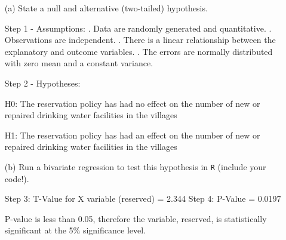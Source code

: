 \documentclass[12pt,letterpaper]{article}
\begin{document}
\newpage

\begin{enumerate}
	\item [(a)] State a null and alternative (two-tailed) hypothesis. 
	
	\noindent
	Step 1 - Assumptions:
	. Data are randomly generated and quantitative.
	. Observations are independent.
	. There is a linear relationship between the explanatory and outcome variables.
	. The errors are normally distributed with zero mean and a constant variance. 
	
	Step 2 - Hypotheses:
	
	H0: The reservation policy has had no effect on the number of new or repaired drinking water facilities in the villages
	
	H1: The reservation policy has had an effect on the number of new or repaired drinking water facilities in the villages
	
	\newpage
	
	\vspace{1cm}
	\item [(b)] Run a bivariate regression to test this hypothesis in \texttt{R} (include your code!).
	
	
	\noindent
	Step 3: T-Value for X variable (reserved)  = 2.344
	\newline
	Step 4: P-Value = 0.0197
	
	P-value is less than 0.05, therefore the variable, reserved, is statistically significant at the 5\% significance level.
	

\end{enumerate}
\end{document}
